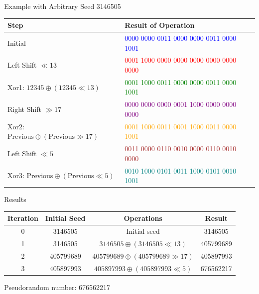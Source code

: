 \documentclass[aspectratio=169]{beamer}
\begin{document}
\begin{frame}{Example with Arbitrary Seed 3146505}
\begin{table}[h]

\begin{tabular}{|l|l|}
\hline
\textbf{Step} & \textbf{Result of Operation} \\
\hline
Initial & 
\textcolor{blue}{0000 0000 0011 0000 0000 0011 0000 1001} \\
\hline
Left Shift $\ll 13$ & 
\textcolor{red}{0001 1000 0000 0000 0000 0000 0000 0000} \\
\hline
Xor1: $12345 \oplus (12345 \ll 13)$ & 
\textcolor{green}{0001 1000 0011 0000 0000 0011 0000 1001} \\
\hline
Right Shift $\gg 17$ & 
\textcolor{purple}{0000 0000 0000 0001 1000 0000 0000 0000} \\
\hline
Xor2: $\text{Previous} \oplus (\text{Previous} \gg 17)$ & 
\textcolor{orange}{0001 1000 0011 0001 1000 0011 0000 1001} \\
\hline
Left Shift $\ll 5$ & 
\textcolor{brown}{0011 0000 0110 0010 0000 0110 0010 0000} \\
\hline
Xor3: $\text{Previous} \oplus (\text{Previous} \ll 5)$ & 
\textcolor{teal}{0010 1000 0101 0011 1000 0101 0010 1001} \\
\hline

\end{tabular}
\end{table}
\end{frame}

\begin{frame}{Results}
  
\begin{table}[h]

\begin{tabular}{|c|c|c|c|}
\hline
Iteration & Initial Seed & Operations & Result \\
\hline
0 & 3146505 & Initial seed & 3146505 \\
1 & 3146505 & $3146505 \oplus (3146505 \ll 13)$ & 405799689 \\
2 & 405799689 & $405799689 \oplus (405799689 \gg 17)$ & 405897993 \\
3 & 405897993 & $405897993 \oplus (405897993 \ll 5)$ & 676562217 \\
\hline
\end{tabular}
\end{table}


Pseudorandom number: 676562217
\end{frame}
\end{document}
